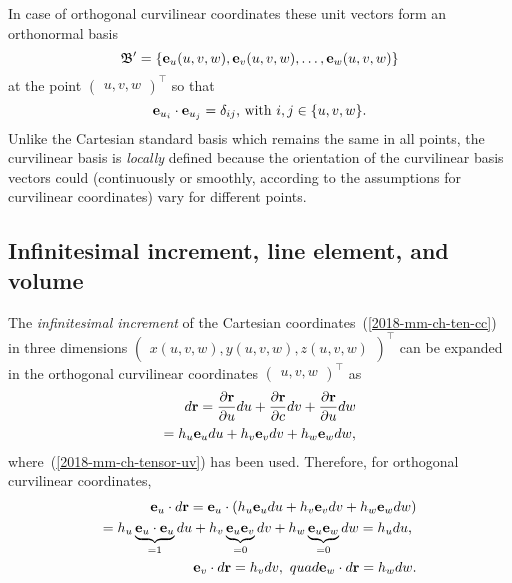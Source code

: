 In case of orthogonal curvilinear coordinates these unit vectors form an orthonormal basis
\begin{equation}
{\frak B}'=\left\{ {\bf e}_{u}(u,v,w), {\bf e}_{v}(u,v,w),\ldots ,{\bf e}_{w} (u,v,w)\right\}
\label{2018-mm-ch-tensor-ob}
\end{equation}
at the point $\begin{pmatrix}u,v,w\end{pmatrix}^\intercal$ so that
\begin{equation}
{\bf e}_{u_i} \cdot {\bf e}_{u_j} = \delta_{ij}
\text{, with }
i,j \in \{u,v,w\}.
\label{2018-mm-ch-tensor-uvob}
\end{equation}
Unlike the Cartesian standard basis which remains the same in all points,
the curvilinear basis is {\em locally} defined because the orientation of the curvilinear basis vectors
could (continuously or smoothly, according to the assumptions for curvilinear coordinates) vary for different points.

\subsection{Infinitesimal increment, line element, and volume}
\label{2018-mm-ch-ctensor-volumeclc}

The {\em infinitesimal increment}
of the Cartesian coordinates~(\ref{2018-mm-ch-ten-cc}) in three dimensions
$
\begin{pmatrix}
x(u,v,w), y(u,v,w), z(u,v,w)
\end{pmatrix}^\intercal
$
can be expanded
in
the orthogonal curvilinear coordinates
$\begin{pmatrix}
u, v, w
\end{pmatrix}^\intercal$ as
\begin{equation}
\begin{split}
d {\bf r}
=
\frac{\partial  {\bf r}}{\partial u} du + \frac{\partial  {\bf r}}{\partial c}dv + \frac{\partial  {\bf r}}{\partial u}dw
\\
=
{ h_u }{\bf e}_u   du + { h_v }{\bf e}_v   dv + { h_w } {\bf e}_w dw
,
\end{split}
\label{2018-mm-ch-tensor-infincr}
\end{equation}
where~(\ref{2018-mm-ch-tensor-uv}) has been used.
Therefore, for orthogonal curvilinear coordinates,
\begin{equation}
\begin{split}
{\bf e}_u \cdot d {\bf r} =
{\bf e}_u \cdot \left({ h_u }{\bf e}_u   du + { h_v }{\bf e}_v   dv + { h_w } {\bf e}_w dw \right) \\
=
{ h_u } \underbrace{{\bf e}_u \cdot {\bf e}_u}_{=1} du
+ { h_v } \underbrace{{\bf e}_u {\bf e}_v}_{=0}   dv
+ { h_w } \underbrace{{\bf e}_u {\bf e}_w}_{=0} dw
=  { h_u } du \text{, }
\\
{\bf e}_v \cdot d {\bf r} =   { h_v } dv ,\ quad
{\bf e}_w \cdot d {\bf r} =   { h_w } dw
.
\end{split}
\label{2018-mm-ch-tensor-etdr}
\end{equation}

